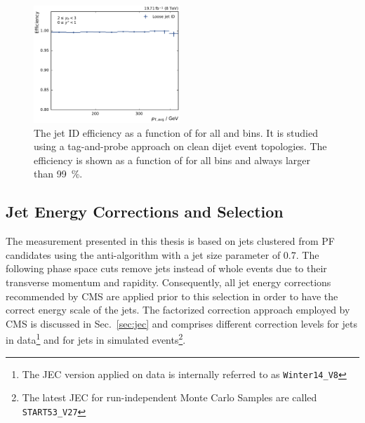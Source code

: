\begin{figure}[htbp]
    \includegraphics[width=0.49\textwidth]{figures/measurement/jetideff_yb2ys0.pdf}
    \caption[Efficiency of the jet ID]{The jet ID efficiency as a function of
    \ptavg for all \ystar and \yboost bins. It is studied using a
    tag-and-probe approach on clean dijet event topologies. The efficiency is
    shown as a function of \ptavg for all bins and always larger than
    \SI{99}{\percent}.}
    \label{fig:jetid_eff}
\end{figure}

\subsection{Jet Energy Corrections and Selection}

The measurement presented in this thesis is based on jets clustered from PF
candidates using the anti-\kt algorithm with a jet size parameter of 0.7. The
following phase space cuts remove jets instead of whole events due to their
transverse momentum and rapidity. Consequently, all jet energy corrections
recommended by CMS are applied prior to this selection in order to have the
correct energy scale of the jets. The factorized correction approach employed by
CMS is discussed in Sec.~\ref{sec:jec} and comprises different correction levels
for jets in data\footnote{The JEC version applied on data is internally referred
to as \texttt{Winter14\_V8}} and for jets in simulated events\footnote{The
latest JEC for run-independent Monte Carlo Samples are called
\texttt{START53\_V27}}.


